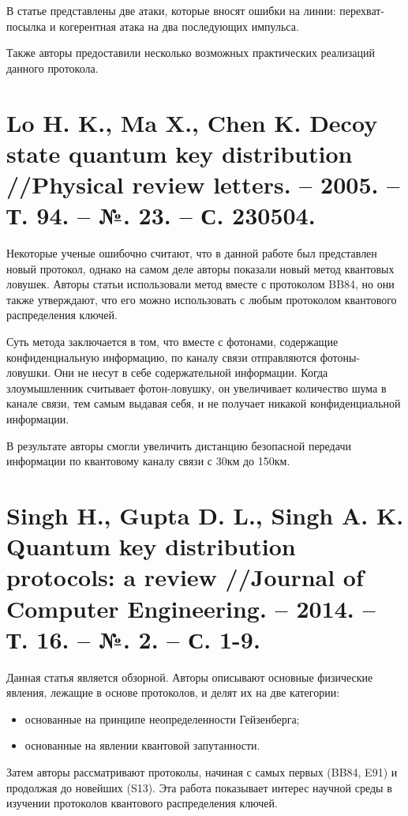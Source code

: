В статье представлены две атаки, которые вносят ошибки на линии: перехват-посылка и когерентная атака на два последующих импульса.

Также авторы предоставили несколько возможных практических реализаций данного протокола.


\section{Lo H. K., Ma X., Chen K. Decoy state quantum key distribution //Physical review letters. – 2005. – Т. 94. – №. 23. – С. 230504.}
Некоторые ученые ошибочно считают, что в данной \cite{lo2005decoy} работе был представлен новый протокол, однако на самом деле авторы показали новый метод квантовых ловушек. Авторы статьи использовали метод вместе с протоколом BB84, но они также утверждают, что его можно использовать с любым протоколом квантового распределения ключей.

Суть метода заключается в том, что вместе с фотонами, содержащие конфиденциальную информацию, по каналу связи отправляются фотоны-ловушки. Они не несут в себе содержательной информации. Когда злоумышленник считывает фотон-ловушку, он увеличивает количество шума в канале связи, тем самым выдавая себя, и не получает никакой конфиденциальной информации.

В результате авторы смогли увеличить дистанцию безопасной передачи информации по квантовому каналу связи с 30км до 150км.

\section{Singh H., Gupta D. L., Singh A. K. Quantum key distribution protocols: a review //Journal of Computer Engineering. – 2014. – Т. 16. – №. 2. – С. 1-9.}
Данная статья \cite{singh2014quantum} является обзорной. Авторы описывают основные физические явления, лежащие в основе протоколов, и делят их на две категории:
\begin{itemize}
	\item основанные на принципе неопределенности Гейзенберга;
	\item основанные на явлении квантовой запутанности.
\end{itemize}

Затем авторы рассматривают протоколы, начиная с самых первых (BB84, E91) и продолжая до новейших (S13). Эта работа показывает интерес научной среды в изучении протоколов квантового распределения ключей.

